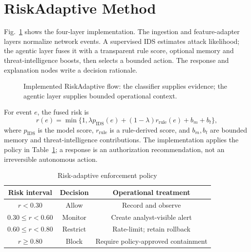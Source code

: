 \documentclass[conference]{IEEEtran}
\begin{document}
\section{RiskAdaptive Method}
Fig.~\ref{fig:architecture} shows the four-layer implementation. The ingestion and feature-adapter layers normalize network events. A supervised IDS estimates attack likelihood; the agentic layer fuses it with a transparent rule score, optional memory and threat-intelligence boosts, then selects a bounded action. The response and explanation nodes write a decision rationale.

\begin{figure}[!t]
\centering
{}
\caption{Implemented RiskAdaptive flow: the classifier supplies evidence; the agentic layer supplies bounded operational context.}
\label{fig:architecture}
\end{figure}

For event $e$, the fused risk is
\begin{equation}
r(e)=\min\{1,\lambda p_{\mathrm{IDS}}(e)+(1-\lambda)r_{\mathrm{rule}}(e)+b_m+b_t\},
\label{eq:risk}
\end{equation}
where $p_{\mathrm{IDS}}$ is the model score, $r_{\mathrm{rule}}$ is a rule-derived score, and $b_m,b_t$ are bounded memory and threat-intelligence contributions. The implementation applies the policy in Table~\ref{tab:policy}; a response is an authorization recommendation, not an irreversible autonomous action.

\begin{table}[!t]
\caption{Risk-adaptive enforcement policy}
\label{tab:policy}
\centering\footnotesize
\begin{tabular}{ccc}
\toprule
\textbf{Risk interval} & \textbf{Decision} & \textbf{Operational treatment}\\
\midrule
$r<0.30$ & Allow & Record and observe\\
$0.30\leq r<0.60$ & Monitor & Create analyst-visible alert\\
$0.60\leq r<0.80$ & Restrict & Rate-limit; retain rollback\\
$r\geq0.80$ & Block & Require policy-approved containment\\
\bottomrule
\end{tabular}
\end{table}
\end{document}
